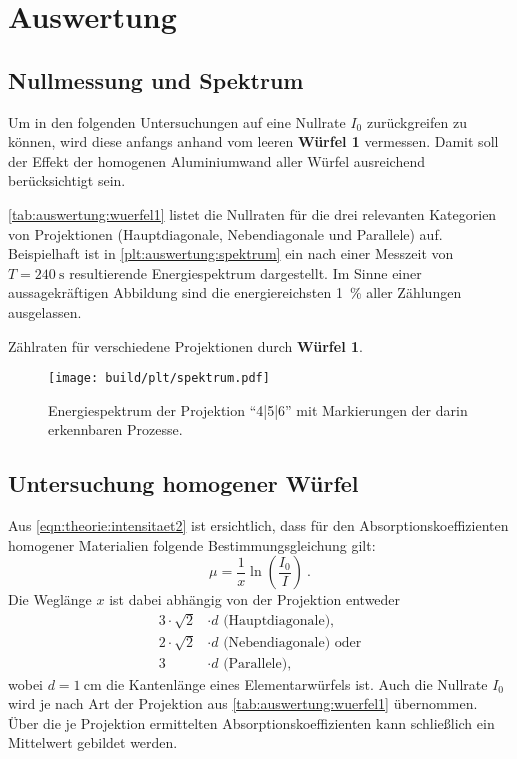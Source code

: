 \section{Auswertung}
\label{sec:auswertung}

\subsection{Nullmessung und Spektrum}

Um in den folgenden Untersuchungen auf eine Nullrate $I_0$ zurückgreifen zu können,
wird diese anfangs anhand vom leeren \textbf{Würfel 1} vermessen.
Damit soll der Effekt der homogenen Aluminiumwand aller Würfel ausreichend berücksichtigt sein.

\autoref{tab:auswertung:wuerfel1} listet die Nullraten für die drei relevanten Kategorien von Projektionen
(Hauptdiagonale, Nebendiagonale und Parallele)
auf.
Beispielhaft ist in \autoref{plt:auswertung:spektrum} ein nach einer Messzeit von $T = \SI{240}{\second}$ resultierende Energiespektrum dargestellt.
Im Sinne einer aussagekräftigen Abbildung sind die energiereichsten \SI{1}{\percent} aller Zählungen ausgelassen.

\begin{table}[H]
    \centering
    \caption{Zählraten für verschiedene Projektionen durch \textbf{Würfel 1}.}
    \label{tab:auswertung:wuerfel1}
\end{table}

\begin{figure}
    \centering
    \texttt{[image: build/plt/spektrum.pdf]}
    \caption{Energiespektrum der Projektion \enquote{4|5|6} mit Markierungen der darin erkennbaren Prozesse.}
    \label{plt:auswertung:spektrum}
\end{figure}


\subsection{Untersuchung homogener Würfel}
Aus \autoref{eqn:theorie:intensitaet2} ist ersichtlich,
dass für den Absorptionskoeffizienten homogener Materialien folgende Bestimmungsgleichung gilt:
\begin{equation*}
    \mu = \frac{1}{x} \ln \left( \frac{I_0}{I} \right) \ .
\end{equation*}
Die Weglänge $x$ ist dabei abhängig von der Projektion entweder
\begin{align*}
    3·\sqrt{2}&·d \text{ (Hauptdiagonale),} \\
    2·\sqrt{2}&·d \text{ (Nebendiagonale) oder} \\
    3&·d \text{ (Parallele),}
\end{align*}
wobei $d = \SI{1}{\centi\meter}$ die Kantenlänge eines Elementarwürfels ist.
Auch die Nullrate $I_0$ wird je nach Art der Projektion aus \autoref{tab:auswertung:wuerfel1} übernommen.
Über die je Projektion ermittelten Absorptionskoeffizienten kann schließlich ein Mittelwert gebildet werden.


